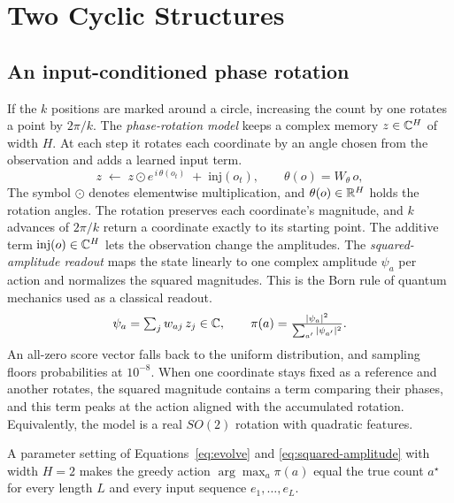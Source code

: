 \section{Two Cyclic Structures}
\label{sec:method}

\subsection{An input-conditioned phase rotation}
\label{sec:arch}
If the $k$ positions are marked around a circle, increasing the count by one
rotates a point by $2\pi/k$. The \emph{phase-rotation model} keeps a complex
memory $z\in\mathbb{C}^H$ of width $H$. At each step it rotates each coordinate by an
angle chosen from the observation and adds a learned input term.
\begin{equation}
z \;\leftarrow\; z \odot e^{\,i\,\theta(o_t)} \;+\; \mathrm{inj}(o_t),
\qquad \theta(o)=W_\theta\, o,
\label{eq:evolve}
\end{equation}
The symbol $\odot$ denotes elementwise multiplication, and
$\theta(o)\in\mathbb{R}^H$ holds the rotation angles. The rotation preserves each
coordinate's magnitude, and $k$ advances of $2\pi/k$ return a coordinate exactly
to its starting point. The additive term $\mathrm{inj}(o)\in\mathbb{C}^H$ lets the
observation change the amplitudes. The \emph{squared-amplitude readout} maps
the state linearly to one complex amplitude $\psi_a$ per action and normalizes
the squared magnitudes. This is the Born rule of quantum mechanics used as a
classical readout.
\begin{equation}
\psi_a = \textstyle\sum_j w_{aj}\, z_j \in \mathbb{C},
\qquad
\pi(a) = \frac{|\psi_a|^2}{\sum_{a'} |\psi_{a'}|^2}.
\label{eq:squared-amplitude}
\end{equation}
An all-zero score vector falls back to the uniform distribution, and sampling
floors probabilities at $10^{-8}$. When one coordinate stays fixed as a reference
and another rotates, the squared magnitude contains a term comparing their
phases, and this term peaks at the action aligned with the accumulated rotation.
Equivalently, the model is a real $SO(2)$ rotation with quadratic features.

\begin{proposition}
\label{prop:exact}
A parameter setting of Equations~\eqref{eq:evolve} and
\eqref{eq:squared-amplitude} with width $H=2$ makes the greedy action
$\arg\max_a \pi(a)$ equal the true count $a^\star$ for every length $L$ and
every input sequence $e_1,\dots,e_L$.
\end{proposition}


